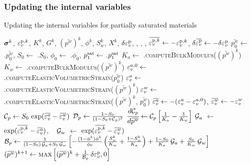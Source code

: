  \subsubsection{Updating the internal variables}
\begin{breakablealgorithm}
  \caption{Updating the internal variables for partially saturated materials}
  \begin{algorithmic}[1]
    \Require $\boldsymbol{\sigma}^k$, $\varepsilon_v^{\text{p},k}$, $K^k$, $G^k$, $(\bar{p^w})^k$, $\phi^k$, $S_w^k$, $X^k$, 
             $\delta\varepsilon_v^{\text{p}}$, , , 
             , 
      \State $\bar{\Veps_v^{\Tp,k}} \leftarrow -\Veps_v^{\Tp,k}$,
             $\delta\bar{\Veps_v^\Tp} \leftarrow -\delta\Veps_v^\Tp$
      \State $\bar{p^w_0} \leftarrow$ .$\bar{p^w_0}$,
             $S_0 \leftarrow$ .$S_0$,
             $\phi_0 \leftarrow$ .$\phi_0$,
             $p_1^{\text{sat}} \leftarrow$ .$p_1^{\text{sat}}$
      \State $K_a \leftarrow$ .\textsc{computeBulkModulus}($(\bar{p^w})^k$)
      \State $K_w \leftarrow$ .\textsc{computeBulkModulus}($(\bar{p^w})^k$)
      \State $\varepsilon_v^{a,0} \leftarrow$ 
        .\textsc{computeElasticVolumetricStrain}($\bar{p^w_0}$)
      \State $\varepsilon_v^a \leftarrow$ 
        .\textsc{computeElasticVolumetricStrain}($(\bar{p^w})^k$)
      \State $\varepsilon_v^w \leftarrow$ 
        .\textsc{computeElasticVolumetricStrain}($(\bar{p^w})^k$, $\bar{p^w_0}$)
      \State $\bar{\Veps_v^a} \leftarrow - (\Veps_v^a - \Veps_v^{a,0})$, 
             $\bar{\Veps_v^w} \leftarrow - \Veps_v^w$ 
      \State $\CalC_p \leftarrow S_0\,\exp(\bar{\Veps_v^a} - \bar{\Veps_v^w})$
      \State $\mathcal{D}_p \leftarrow \frac{1 - S_0}{(1 - S_0 + \mathcal{C}_p)^2}$
      \State $\Deriv{\CalC_p}{\bar{p^w}} \leftarrow \CalC_p \left[\frac{1}{K_a} - \frac{1}{K_w}\right]$
      \State $\mathcal{G}_a$ $\leftarrow$ $\exp(\bar{\Veps_v^{\Tp,k}} - \bar{\Veps_v^a})$, ~
             $\mathcal{G}_w$ $\leftarrow$ $\exp(\bar{\Veps_v^{\Tp,k}} - \bar{\Veps_v^w})$
      \State $\mathcal{B}_p \leftarrow \frac{1}{(1 - S_0)\,\mathcal{G}_a + S_0\,\mathcal{G}_w}
               \left[-\frac{(1-\phi^k)\phi^k}{\phi_0} \left(\frac{S_w^k}{K_w} + \frac{1 - S_w^k}{K_a} \right) + 
               \frac{1 - S_0}{K_a}\,\mathcal{G}_a + \frac{S_0}{K_w}\,\mathcal{G}_w \right] $ 
      \State $(\bar{p^w})^{k+1} \leftarrow \text{\textsc{max}}\left[(\bar{p^w})^k + \frac{1}{\CalB_p}\,\delta\Veps_v^\Tp, 0\right]$ 

\end{algorithmic}
\end{breakablealgorithm}
